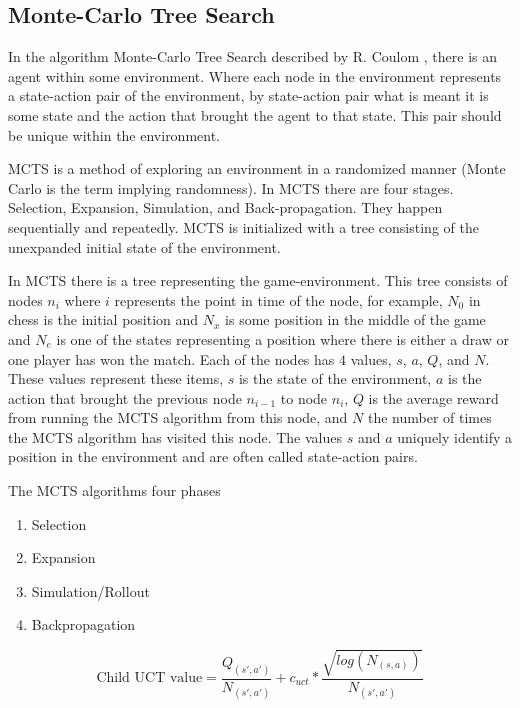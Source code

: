 \subsection{Monte-Carlo Tree Search}

\label{sec:mcts}

In the algorithm Monte-Carlo Tree Search described by R. Coulom \cite{mcts:coulom}, there is an agent within some environment. Where each node in the environment represents a state-action pair of the environment, by state-action pair what is meant it is some state and the action that brought the agent to that state. This pair should be unique within the environment.

MCTS is a method of exploring an environment in a randomized manner (Monte Carlo is the term implying randomness). In MCTS there are four stages. Selection, Expansion, Simulation, and Back-propagation. They happen sequentially and repeatedly. MCTS is initialized with a tree consisting of the unexpanded initial state of the environment.

In MCTS there is a tree representing the game-environment. This tree consists of nodes $n_i$ where $i$ represents the point in time of the node, for example, $N_0$ in chess is the initial position and $N_x$ is some position in the middle of the game and $N_e$ is one of the states representing a position where there is either a draw or one player has won the match. Each of the nodes has $4$ values, $s$, $a$, $Q$, and $N$. These values represent these items, $s$ is the state of the environment, $a$ is the action that brought the previous node $n_{i-1}$ to node $n_i$, $Q$ is the average reward from running the MCTS algorithm from this node, and $N$ the number of times the MCTS algorithm has visited this node. The values $s$ and $a$ uniquely identify a position in the environment and are often called state-action pairs.

The MCTS algorithms four phases
\begin{enumerate}
  \item Selection
  \item Expansion
  \item Simulation/Rollout
  \item Backpropagation
\end{enumerate}


\begin{equation} \label{UCT_formula}
  \text{Child UCT value} = \frac{Q_{(s',a')}}{N_{(s',a')}} + c_{uct} * \frac{\sqrt{log(N_{(s,a)})}}{N_{(s',a')}}
\end{equation}

